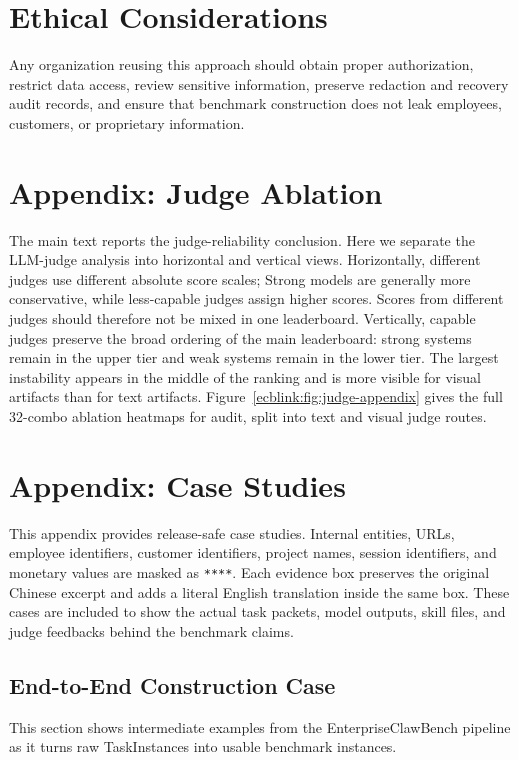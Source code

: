\documentclass{llmxive}
\providecommand{\ecbpipe}{EnterpriseClawBench pipeline}
\providecommand{\inlinett}[1]{{\footnotesize\texttt{#1}}}
\begin{document}
\section{Ethical Considerations}
Any organization reusing this approach should obtain proper authorization, restrict data access, review sensitive information, preserve redaction and recovery audit records, and ensure that benchmark construction does not leak employees, customers, or proprietary information.



\appendix

\section{Appendix: Judge Ablation}
\label{ecblink:sec:judge-ablation}
The main text reports the judge-reliability conclusion. Here we separate the LLM-judge analysis into horizontal and vertical views. Horizontally, different judges use different absolute score scales; Strong models are generally more conservative, while less-capable judges assign higher scores. Scores from different judges should therefore not be mixed in one leaderboard. Vertically, capable judges preserve the broad ordering of the main leaderboard: strong systems remain in the upper tier and weak systems remain in the lower tier. The largest instability appears in the middle of the ranking and is more visible for visual artifacts than for text artifacts. Figure~\ref{ecblink:fig:judge-appendix} gives the full 32-combo ablation heatmaps for audit, split into text and visual judge routes.

\section{Appendix: Case Studies}
This appendix provides release-safe case studies. Internal entities, URLs, employee identifiers, customer identifiers, project names, session identifiers, and monetary values are masked as \inlinett{****}. Each evidence box preserves the original Chinese excerpt and adds a literal English translation inside the same box. These cases are included to show the actual task packets, model outputs, skill files, and judge feedbacks behind the benchmark claims.

\subsection{End-to-End Construction Case}
This section shows intermediate examples from the \ecbpipe{} as it turns raw TaskInstances into usable benchmark instances.
\end{document}
